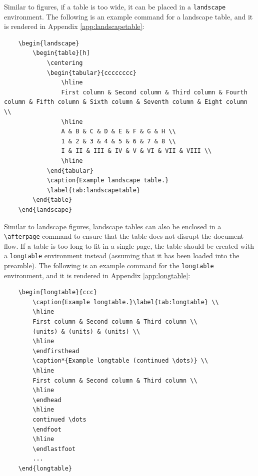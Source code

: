\documentclass{umalayathesis}
\begin{document}
Similar to figures, if a table is too wide, it can be placed in a \texttt{landscape} environment. The following is an example command for a landscape table, and it is rendered in Appendix \ref{app:landscapetable}:
\begin{verbatim}
    \begin{landscape}
        \begin{table}[h]
            \centering
            \begin{tabular}{cccccccc}
                \hline
                First column & Second column & Third column & Fourth column & Fifth column & Sixth column & Seventh column & Eight column \\
                \hline
                A & B & C & D & E & F & G & H \\
                1 & 2 & 3 & 4 & 5 & 6 & 7 & 8 \\
                I & II & III & IV & V & VI & VII & VIII \\
                \hline
            \end{tabular}
            \caption{Example landscape table.}
            \label{tab:landscapetable}
        \end{table}
    \end{landscape}
\end{verbatim}

Similar to landscape figures, landscape tables can also be enclosed in a \verb|\afterpage| command to ensure that the table does not disrupt the document flow. If a table is too long to fit in a single page, the table should be created with a \texttt{longtable} environment instead (assuming that it has been loaded into the preamble). The following is an example command for the \texttt{longtable} environment, and it is rendered in Appendix \ref{app:longtable}:
\begin{verbatim}
    \begin{longtable}{ccc}
        \caption{Example longtable.}\label{tab:longtable} \\
        \hline
        First column & Second column & Third column \\
        (units) & (units) & (units) \\
        \hline
        \endfirsthead
        \caption*{Example longtable (continued \dots)} \\
        \hline
        First column & Second column & Third column \\
        \hline
        \endhead
        \hline
        continued \dots
        \endfoot
        \hline
        \endlastfoot
        ...
    \end{longtable}
\end{verbatim}
\end{document}

